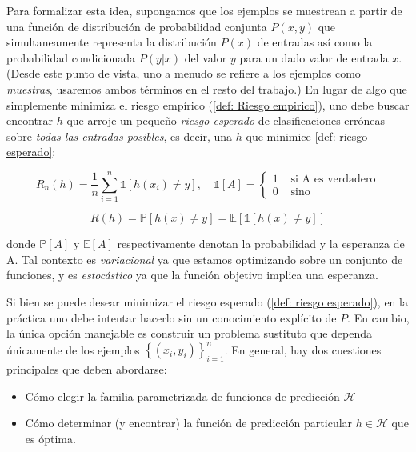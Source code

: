 Para formalizar esta idea, supongamos que los ejemplos se muestrean a partir de una funci\'on de distribuci\'on de probabilidad conjunta $P (x, y)$ que simultaneamente representa la distribuci\'on $P (x)$ de entradas as\'i como la probabilidad condicionada $P (y \vert x)$ del valor $y$ para un dado valor de entrada $x$. (Desde este punto de vista, uno a menudo se refiere a los ejemplos como \textit{muestras}, usaremos ambos t\'erminos en el resto del trabajo.) En lugar de algo que simplemente minimiza el riesgo emp\'irico (\ref{def: Riesgo empirico}), uno debe buscar encontrar $h$ que arroje un peque\~no \textit{riesgo esperado} de clasificaciones err\'oneas sobre \textit{todas las entradas posibles}, es decir, una $h$ que minimice \ref{def: riesgo esperado}:

\begin{equation}
\label{def: Riesgo empirico}
R_n(h) = \frac{1}{n}\sum\limits_{i=1}^{n}{\mathbb{1}\left[ h(x_i) \neq y \right]}, \quad \mathbb{1}\left[A\right] = \left\lbrace \begin{array}{cc}
1 & \text{ si A es verdadero} \\
0 & \text{ sino }
\end{array}\right.
\end{equation}

\begin{equation}
\label{def: riesgo esperado}
R(h)=\mathbb{P}\left[h(x) \neq y \right] = \mathbb{E} \left[\mathbb{1} \left[h(x) \neq y \right] \right]
\end{equation}

donde $\mathbb{P}\left[A \right]$ y $\mathbb{E}\left[A \right]$ respectivamente denotan la probabilidad y la esperanza de A. Tal contexto es \textit{variacional} ya que estamos optimizando sobre un conjunto de funciones, y es \textit{estoc\'astico} ya que la funci\'on objetivo implica una esperanza.

Si bien se puede desear minimizar el riesgo esperado (\ref{def: riesgo esperado}), en la pr\'actica uno debe intentar hacerlo sin un conocimiento expl\'icito de $P$. En cambio, la \'unica opci\'on manejable es construir un problema sustituto que dependa \'unicamente de los ejemplos $\left\lbrace\left(x_{i},y_{i}\right)\right\rbrace^{n}_{i=1}$. En general, hay dos cuestiones principales que deben abordarse: 

\begin{itemize}
	\item C\'omo elegir la familia parametrizada de funciones de predicci\'on $\mathcal{H}$
	\item C\'omo determinar (y encontrar) la funci\'on de predicci\'on particular $h \in \mathcal{H}$ que es \'optima.
\end{itemize}

